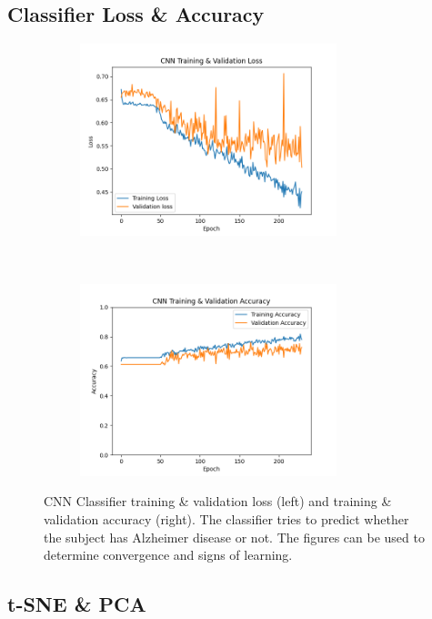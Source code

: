 \documentclass[12pt, fleqn, titlepage]{article}
\newcommand{\1}[1]{\mathds{1}\left[#1\right]}
\begin{document}
\subsection{Classifier Loss \& Accuracy}\label{result_loss_cnn}

\begin{figure}[H]
	\centering
	\begin{subfigure}[t]{0.5\textwidth}
		\centering
		\includegraphics[height=2.2in]{imgs/classifier/lr_0.0002_loss_curve}%
	\end{subfigure}%
	~
	\begin{subfigure}[t]{0.5\textwidth}
	\centering
	\includegraphics[height=2.2in]{imgs/classifier/lr_0.0002_accuracy_curve}%

\end{subfigure}
	\caption{CNN Classifier training \& validation loss (left) and training \& validation accuracy (right). The classifier tries to predict whether the subject has Alzheimer disease or not. The figures can be used to determine convergence and signs of learning. }
		\label{fig:loss_acc}
\end{figure}

\vspace*{-1cm}

\subsection{t-SNE \& PCA}\label{result_dim_reduction}
\end{document}
